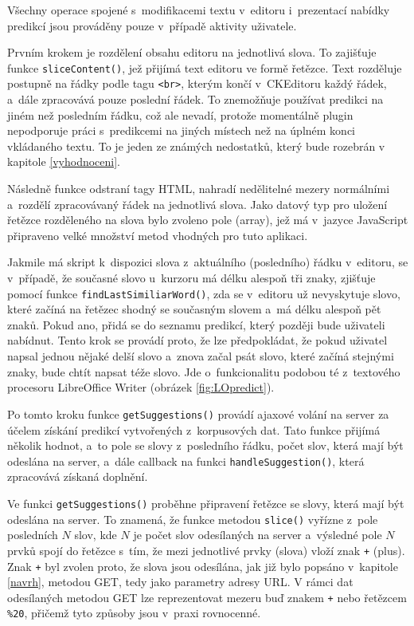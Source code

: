 \documentclass[a4paper,11pt,openany]{book} %
\begin{document}
Všechny operace spojené s~modifikacemi textu v~editoru i~prezentací nabídky predikcí jsou prováděny pouze v~případě aktivity uživatele. 

Prvním krokem je rozdělení obsahu editoru na jednotlivá slova. To zajišťuje funkce {\tt sliceContent()}, jež přijímá text editoru ve formě řetězce. Text rozděluje postupně na řádky podle tagu {\tt <br>}, kterým končí v~CKEditoru každý řádek, a~dále zpracovává pouze poslední řádek. To znemožňuje používat predikci na jiném než posledním řádku, což ale nevadí, protože momentálně plugin nepodporuje práci s~predikcemi na jiných místech než na úplném konci vkládaného textu. To je jeden ze známých nedostatků, který bude rozebrán v kapitole \ref{vyhodnoceni}. 

Následně funkce odstraní tagy HTML, nahradí nedělitelné mezery normálními a~rozdělí zpracovávaný řádek na jednotlivá slova. Jako datový typ pro uložení řetězce rozděleného na slova bylo zvoleno pole (array), jež má v~jazyce JavaScript připraveno velké množství metod vhodných pro tuto aplikaci. 

Jakmile má skript k~dispozici slova z~aktuálního (posledního) řádku v~editoru, se v~případě, že současné slovo u~kurzoru má délku alespoň tři znaky, zjišťuje pomocí funkce {\tt findLastSimiliarWord()}, zda se v~editoru už nevyskytuje slovo, které začíná na řetězec shodný se současným slovem a~má délku alespoň pět znaků. Pokud ano, přidá se do seznamu predikcí, který později bude uživateli nabídnut. Tento krok se provádí proto, že lze předpokládat, že pokud uživatel napsal jednou nějaké delší slovo a~znova začal psát slovo, které začíná stejnými znaky, bude chtít napsat téže slovo. Jde o~funkcionalitu podobou té z~textového procesoru LibreOffice Writer (obrázek \ref{fig:LOpredict}).

Po tomto kroku funkce {\tt getSuggestions()} provádí ajaxové volání na server za účelem získání predikcí vytvořených z~korpusových dat. Tato funkce přijímá několik hodnot, a~to pole se slovy z~posledního řádku, počet slov, která mají být odeslána na server, a~dále callback na funkci {\tt handleSuggestion()}, která zpracovává získaná doplnění.

Ve funkci {\tt getSuggestions()} proběhne připravení řetězce se slovy, která mají být odeslána na server. To znamená, že funkce metodou {\tt slice()} vyřízne z~pole posledních $N$ slov, kde $N$ je počet slov odesílaných na server a~výsledné pole $N$ prvků spojí do řetězce s~tím, že mezi jednotlivé prvky (slova) vloží znak {\tt +} (plus). Znak {\tt +} byl zvolen proto, že slova jsou odesílána, jak již bylo popsáno v~kapitole \ref{navrh}, metodou GET, tedy jako parametry adresy URL. V rámci dat odesílaných metodou GET lze reprezentovat mezeru buď znakem {\tt +} nebo řetězcem {\tt \%20}, přičemž tyto způsoby jsou v~praxi rovnocenné.
\end{document}
